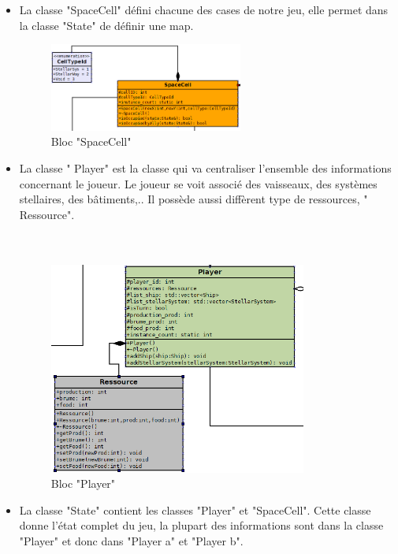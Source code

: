 \begin{itemize}
\item La classe "SpaceCell" défini chacune des cases de notre jeu, elle permet dans la classe "State" de définir une map. \\

\begin{figure}[!h]
\centering
\includegraphics[width=0.6\textwidth]{pics/final_state/classe_SpaceCell1.PNG}
\caption[Bloc "SpaceCell"]{\label{figure_simple}Bloc "SpaceCell"}
\end{figure}

\item La classe " Player" est la classe qui va centraliser l'ensemble des informations concernant le joueur. Le joueur se voit associé des vaisseaux, des systèmes stellaires, des bâtiments,.. Il possède aussi diffèrent type de ressources, " Ressource".  \\ \\
\\

\begin{figure}[!h]
\centering
\includegraphics[width=0.8\textwidth]{pics/final_state/classe_player1.PNG}
\caption[Bloc "Player"]{\label{figure_simple}Bloc "Player"}
\end{figure}

\item La classe "State"  contient les classes "Player" et "SpaceCell". Cette classe donne l'état complet du jeu, la plupart des informations sont dans la classe "Player" et donc dans "Player a" et "Player b". \\



\end{itemize}
